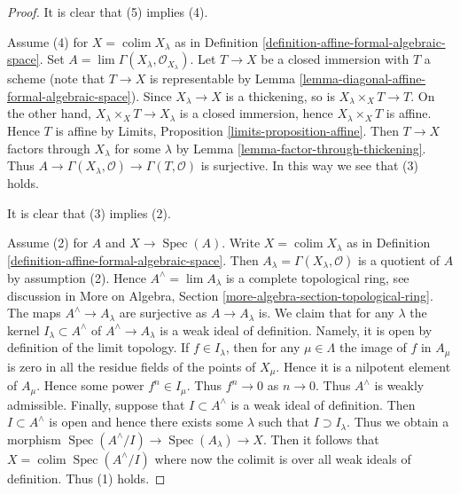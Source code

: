 \documentclass{stacks-project}
\theoremstyle{plain}
\theoremstyle{definition}
\theoremstyle{remark}
\numberwithin{equation}{subsection}
\def\lim{\mathop{\mathrm{lim}}\nolimits}
\def\colim{\mathop{\mathrm{colim}}\nolimits}
\def\Spec{\mathop{\mathrm{Spec}}}
\begin{document}
\begin{proof}
It is clear that (5) implies (4).

\medskip\noindent
Assume (4) for $X = \colim X_\lambda$ as in
Definition \ref{definition-affine-formal-algebraic-space}.
Set $A = \lim \Gamma(X_\lambda, \mathcal{O}_{X_\lambda})$.
Let $T \to X$ be a closed immersion with $T$ a scheme
(note that $T \to X$ is representable by
Lemma \ref{lemma-diagonal-affine-formal-algebraic-space}).
Since $X_\lambda \to X$ is a thickening, so is
$X_\lambda \times_X T \to T$. On the other hand,
$X_\lambda \times_X T \to X_\lambda$ is a closed immersion,
hence $X_\lambda \times_X T$ is affine. Hence $T$ is affine
by Limits, Proposition \ref{limits-proposition-affine}.
Then $T \to X$ factors through $X_\lambda$ for some $\lambda$
by Lemma \ref{lemma-factor-through-thickening}.
Thus $A \to \Gamma(X_\lambda, \mathcal{O}) \to \Gamma(T, \mathcal{O})$
is surjective. In this way we see that (3) holds.

\medskip\noindent
It is clear that (3) implies (2).

\medskip\noindent
Assume (2) for $A$ and $X \to \Spec(A)$. Write $X = \colim X_\lambda$
as in Definition \ref{definition-affine-formal-algebraic-space}.
Then $A_\lambda = \Gamma(X_\lambda, \mathcal{O})$ is a quotient
of $A$ by assumption (2). Hence $A^\wedge = \lim A_\lambda$
is a complete topological ring, see discussion in
More on Algebra, Section \ref{more-algebra-section-topological-ring}.
The maps $A^\wedge \to A_\lambda$ are surjective as $A \to A_\lambda$ is.
We claim that for any $\lambda$ the kernel $I_\lambda \subset A^\wedge$ of
$A^\wedge \to A_\lambda$ is a weak ideal of definition.
Namely, it is open by definition of the limit topology.
If $f \in I_\lambda$, then for any $\mu \in \Lambda$
the image of $f$ in $A_\mu$ is zero in all the residue fields
of the points of $X_\mu$. Hence it is a nilpotent element
of $A_\mu$. Hence some power $f^n \in I_\mu$. Thus $f^n \to 0$
as $n \to 0$. Thus $A^\wedge$ is weakly admissible.
Finally, suppose that $I \subset A^\wedge$ is a weak ideal
of definition. Then $I \subset A^\wedge$ is open and hence there exists
some $\lambda$ such that $I \supset I_\lambda$. Thus we obtain a morphism
$\Spec(A^\wedge/I) \to \Spec(A_\lambda) \to X$.
Then it follows that $X = \colim \Spec(A^\wedge/I)$ where now
the colimit is over all weak ideals of definition.
Thus (1) holds.


\end{proof}
\end{document}
